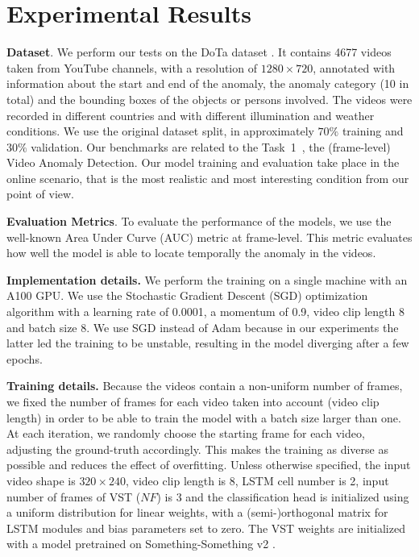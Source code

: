 \section{Experimental Results}
\label{sec:experiments}


\noindent\textbf{Dataset}.
We perform our tests on the DoTa dataset \cite{9712446}.
It contains 4677 videos taken from YouTube channels, with a resolution of $1280 \times 720$, annotated with information about the start and end of the anomaly, the anomaly category (10 in total) and the bounding boxes of the objects or persons involved.
The videos were recorded in different countries and with different illumination and weather conditions.
We use the original dataset split, in approximately $70\%$ training and $30\%$ validation.
Our benchmarks are related to the Task~1~\cite{9712446}, the (frame-level) Video Anomaly Detection.
Our model training and evaluation take place in the online scenario, that is the most realistic and most interesting condition from our point of view.

\noindent\textbf{Evaluation Metrics}.
To evaluate the performance of the models, we use the well-known Area Under Curve (AUC) metric at frame-level.
This metric evaluates how well the model is able to locate temporally the anomaly in the videos. 

\noindent\textbf{Implementation details.}
We perform the training on a single machine with an A100 GPU\@.
We use the Stochastic Gradient Descent (SGD) optimization algorithm with a learning rate of 0.0001, a momentum of 0.9, video clip length 8 and batch size 8.
We use SGD instead of Adam because in our experiments the latter led the training to be unstable, resulting in the model diverging after a few epochs.

\noindent\textbf{Training details.}
Because the videos contain a non-uniform number of frames, we fixed the number of frames for each video taken into account (video clip length) in order to be able to train the model with a batch size larger than one.
At each iteration, we randomly choose the starting frame for each video, adjusting the ground-truth accordingly. This makes the training as diverse as possible and reduces the effect of overfitting.
Unless otherwise specified, the input video shape is $320 \times 240$, video clip length is 8, LSTM cell number is 2, input number of frames of VST ($NF$) is 3 and the classification head is initialized using a uniform distribution for linear weights, with a (semi-)orthogonal matrix for LSTM modules and bias parameters set to zero. The VST weights are initialized with a model pretrained on Something-Something v2 \cite{goyal2017something}.

